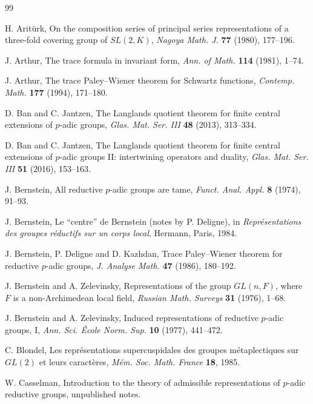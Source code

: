 \documentclass[12pt,letterpaper]{article}
\numberwithin{equation}{section}
\theoremstyle{definition}
\begin{document}
\begin{thebibliography}{99}

 H. Arit\"urk, On the composition series of principal series
representations of a three-fold covering group of $SL(2,K)$, \emph{Nagoya Math. J.}
\textbf{77} (1980), 177--196.

 J. Arthur, The trace formula in invariant form, \emph{Ann. of Math.}
\textbf{114} (1981), 1--74.

 J. Arthur, The trace Paley--Wiener theorem for Schwartz functions,
\emph{Contemp. Math.} \textbf{177} (1994), 171--180.

 D. Ban and C. Jantzen, The Langlands quotient theorem for finite
central extensions of $p$-adic groups, \emph{Glas. Mat. Ser. III} \textbf{48} (2013),
313--334.

 D. Ban and C. Jantzen, The Langlands quotient theorem for finite
central extensions of $p$-adic groups II: intertwining operators and duality, \emph{Glas.
Mat. Ser. III} \textbf{51} (2016), 153--163.

 J. Bernstein, All reductive $p$-adic groups are tame, \emph{Funct.
Anal. Appl.} \textbf{8} (1974), 91--93.

 J. Bernstein, Le ``centre'' de Bernstein (notes by P. Deligne), in
\emph{Repr\'esentations des groupes r\'eductifs sur un corps local}, Hermann, Paris, 1984.

 J. Bernstein, P. Deligne and D. Kazhdan, Trace Paley--Wiener theorem
for reductive $p$-adic groups, \emph{J. Analyse Math.} \textbf{47} (1986), 180--192.

 J. Bernstein and A. Zelevinsky, Representations of the group
$GL(n,F)$, where $F$ is a non-Archimedean local field, \emph{Russian Math. Surveys}
\textbf{31} (1976), 1--68.

 J. Bernstein and A. Zelevinsky, Induced representations of reductive
$p$-adic groups, I, \emph{Ann. Sci. \'Ecole Norm. Sup.} \textbf{10} (1977), 441--472.

 C. Blondel, Les repr\'esentations supercuspidales des groupes
m\'etaplectiques sur $GL(2)$ et leurs caract\`eres, \emph{M\'em. Soc. Math. France}
\textbf{18}, 1985.

 W. Casselman, Introduction to the theory of admissible
representations of $p$-adic reductive groups, unpublished notes.


\end{thebibliography}
\end{document}
